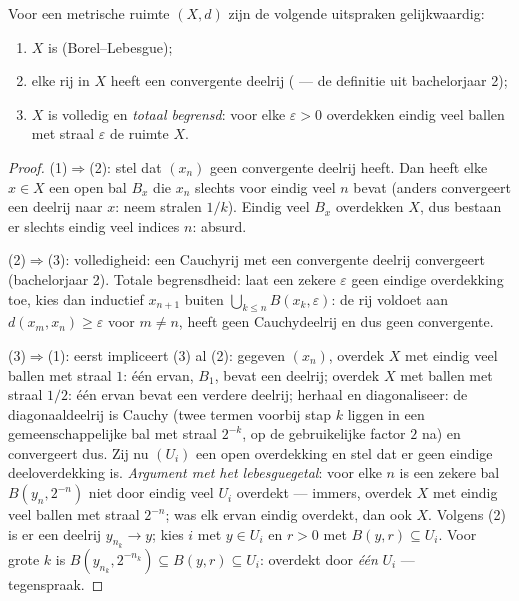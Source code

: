 \begin{theorem}
\label{thm:b3:topology:metriccompact}
Voor een metrische ruimte $(X, d)$ zijn de volgende uitspraken
gelijkwaardig:
\begin{enumerate}
  \item $X$ is  (Borel--Lebesgue);
  \item elke rij in $X$ heeft een convergente deelrij
        ( --- de definitie uit bachelorjaar 2);
  \item $X$ is volledig en \emph{totaal begrensd}: voor elke
        $\varepsilon > 0$ overdekken eindig veel ballen met straal
        $\varepsilon$ de ruimte $X$.
\end{enumerate}
\end{theorem}

\begin{proof}
(1)$\Rightarrow$(2): stel dat $(x_n)$ geen convergente deelrij
heeft. Dan heeft elke $x \in X$ een open bal $B_x$ die $x_n$
slechts voor eindig veel $n$ bevat (anders convergeert een deelrij
naar $x$: neem stralen $1/k$). Eindig veel $B_x$ overdekken $X$,
dus bestaan er slechts eindig veel indices $n$: absurd.

(2)$\Rightarrow$(3): volledigheid: een Cauchyrij met een
convergente deelrij convergeert (bachelorjaar 2). Totale
begrensdheid: laat een zekere $\varepsilon$ geen eindige
overdekking toe, kies dan inductief $x_{n+1}$ buiten
$\bigcup_{k\leq n} B(x_k, \varepsilon)$: de rij voldoet aan
$d(x_m, x_n) \geq \varepsilon$ voor $m \neq n$, heeft geen
Cauchydeelrij en dus geen convergente.

(3)$\Rightarrow$(1): eerst impliceert (3) al (2): gegeven $(x_n)$,
overdek $X$ met eindig veel ballen met straal $1$: één ervan,
$B_1$, bevat een deelrij; overdek $X$ met ballen met straal $1/2$:
één ervan bevat een verdere deelrij; herhaal en diagonaliseer: de
diagonaaldeelrij is Cauchy (twee termen voorbij stap $k$ liggen in
een gemeenschappelijke bal met straal $2^{-k}$, op de gebruikelijke
factor $2$ na) en convergeert dus. Zij nu $(U_i)$ een open
overdekking en stel dat er geen eindige deeloverdekking is.
\emph{Argument met het lebesguegetal}: voor elke $n$ is een zekere
bal $B(y_n, 2^{-n})$ niet door eindig veel $U_i$ overdekt ---
immers, overdek $X$ met eindig veel ballen met straal $2^{-n}$;
was elk ervan eindig overdekt, dan ook $X$. Volgens (2) is er een
deelrij $y_{n_k} \to y$; kies $i$ met $y \in U_i$ en $r > 0$ met
$B(y, r) \subseteq U_i$. Voor grote $k$ is $B(y_{n_k}, 2^{-n_k})
\subseteq B(y, r) \subseteq U_i$: overdekt door \emph{één} $U_i$
--- tegenspraak.
\end{proof}

